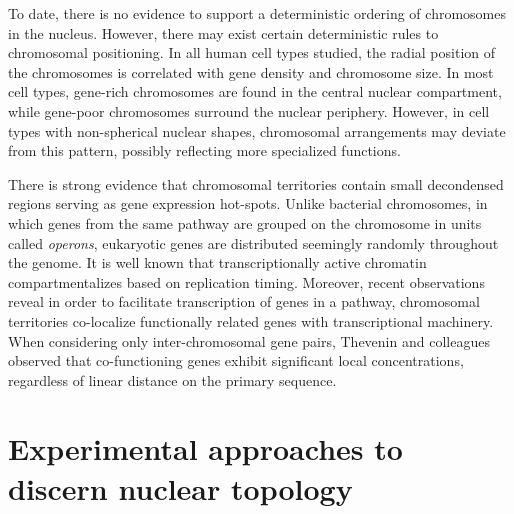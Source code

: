 
To date, there is no evidence to support a deterministic ordering of chromosomes in the nucleus.  However, there may exist certain deterministic rules to
chromosomal positioning.  In all human cell types studied, the radial position of the chromosomes is correlated with gene density and chromosome
size\cite{sun2000}\cite{bolzer2005}.  In most cell types, gene-rich chromosomes are found in the central nuclear compartment, while gene-poor
chromosomes surround the nuclear periphery\cite{boyle2001}\cite{kozubek2005}.  However, in cell types with non-spherical nuclear shapes, chromosomal
arrangements may deviate from this pattern, possibly reflecting more specialized functions\cite{bolzer2005}.

There is strong evidence that chromosomal territories contain small decondensed regions serving as gene expression hot-spots.  Unlike bacterial chromosomes,
in which genes from the same pathway are grouped on the chromosome in units called \textit{operons}, eukaryotic genes are distributed seemingly randomly
throughout the genome\cite{jacob1961}.  It is well known that transcriptionally active chromatin compartmentalizes based on replication
timing\cite{ferreira1997}\cite{sadoni1999}\cite{thevenin2014}.  Moreover, recent observations reveal in order to facilitate transcription of genes in
a pathway, chromosomal territories co-localize functionally related genes with transcriptional machinery.  When considering only inter-chromosomal gene
pairs, Thevenin and colleagues observed that co-functioning genes exhibit significant local concentrations, regardless
of linear distance on the primary sequence\cite{thevenin2014}.



\section*{Experimental approaches to discern nuclear topology}

